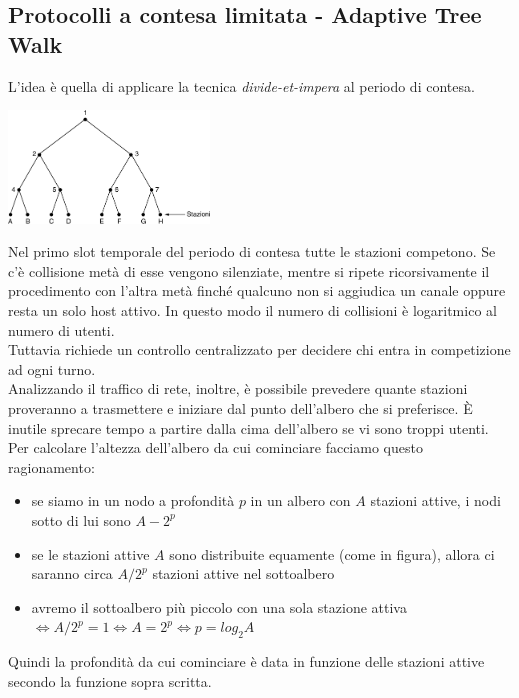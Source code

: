 \documentclass[10pt,a4paper,twoside]{article}
\begin{document}
\subsection{Protocolli a contesa limitata - Adaptive Tree Walk}
L'idea è quella di applicare la tecnica \textit{divide-et-impera} al periodo di contesa.\\
\begin{center}
\includegraphics[width=0.4\textwidth]{images/adaptive_tree_walk.png}
\end{center}
Nel primo slot temporale del periodo di contesa tutte le stazioni competono. Se c'è collisione metà di esse vengono silenziate, mentre si ripete ricorsivamente il procedimento con l'altra metà finché qualcuno non si aggiudica un canale oppure resta un solo host attivo. In questo modo il numero di collisioni è logaritmico al numero di utenti.\\
Tuttavia richiede un controllo centralizzato per decidere chi entra in competizione ad ogni turno.\\
Analizzando il traffico di rete, inoltre, è possibile prevedere quante stazioni proveranno a trasmettere e iniziare dal punto dell'albero che si preferisce. È inutile sprecare tempo a partire dalla cima dell'albero se vi sono troppi utenti.\\
Per calcolare l'altezza dell'albero da cui cominciare facciamo questo ragionamento:
\begin{itemize}
\item se siamo in un nodo a profondità $p$ in un albero con $A$ stazioni attive, i nodi sotto di lui sono $A-2^p$
\item se le stazioni attive $A$ sono distribuite equamente (come in figura), allora ci saranno circa $A/2^p$ stazioni attive nel sottoalbero
\item avremo il sottoalbero più piccolo con una sola stazione attiva $\iff A/2^p=1 \iff A=2^p \iff p=log_2A$
\end{itemize}
Quindi la profondità da cui cominciare è data in funzione delle stazioni attive secondo la funzione sopra scritta.
\end{document}
